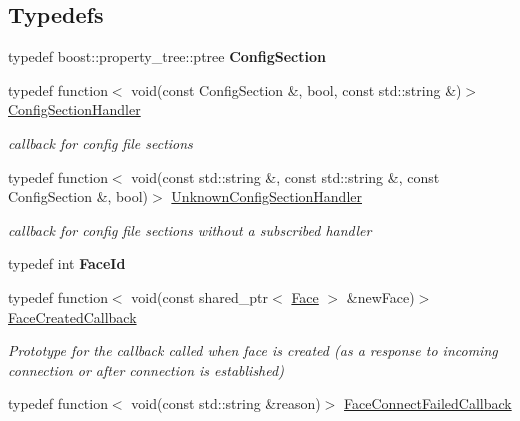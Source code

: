 \subsection*{Typedefs}
\begin{DoxyCompactItemize}
\item 
typedef boost\+::property\+\_\+tree\+::ptree {\bfseries Config\+Section}\hypertarget{namespacenfd_abad0268fc887376260d05c21d10426d4}{}\label{namespacenfd_abad0268fc887376260d05c21d10426d4}

\item 
typedef function$<$ void(const Config\+Section \&, bool, const std\+::string \&)$>$ \hyperlink{namespacenfd_ae90d10c3eaad87418aa1dc2ad251aec5}{Config\+Section\+Handler}\hypertarget{namespacenfd_ae90d10c3eaad87418aa1dc2ad251aec5}{}\label{namespacenfd_ae90d10c3eaad87418aa1dc2ad251aec5}

\begin{DoxyCompactList}\small\item\em callback for config file sections \end{DoxyCompactList}\item 
typedef function$<$ void(const std\+::string \&, const std\+::string \&, const Config\+Section \&, bool)$>$ \hyperlink{namespacenfd_a5b37a7c021db2aa61fe8780e1b42c02c}{Unknown\+Config\+Section\+Handler}\hypertarget{namespacenfd_a5b37a7c021db2aa61fe8780e1b42c02c}{}\label{namespacenfd_a5b37a7c021db2aa61fe8780e1b42c02c}

\begin{DoxyCompactList}\small\item\em callback for config file sections without a subscribed handler \end{DoxyCompactList}\item 
typedef int {\bfseries Face\+Id}\hypertarget{namespacenfd_ae7cf06858b6aa41c3ee4ab48a79c3d0f}{}\label{namespacenfd_ae7cf06858b6aa41c3ee4ab48a79c3d0f}

\item 
typedef function$<$ void(const shared\+\_\+ptr$<$ \hyperlink{classnfd_1_1Face}{Face} $>$ \&new\+Face)$>$ \hyperlink{namespacenfd_a6d4b91580c829552a452c53458381b0f}{Face\+Created\+Callback}\hypertarget{namespacenfd_a6d4b91580c829552a452c53458381b0f}{}\label{namespacenfd_a6d4b91580c829552a452c53458381b0f}

\begin{DoxyCompactList}\small\item\em Prototype for the callback called when face is created (as a response to incoming connection or after connection is established) \end{DoxyCompactList}\item 
typedef function$<$ void(const std\+::string \&reason)$>$ \hyperlink{namespacenfd_ae87d4f07de26f4939691439b51f2dd83}{Face\+Connect\+Failed\+Callback}\hypertarget{namespacenfd_ae87d4f07de26f4939691439b51f2dd83}{}\label{namespacenfd_ae87d4f07de26f4939691439b51f2dd83}


\end{DoxyCompactItemize}
